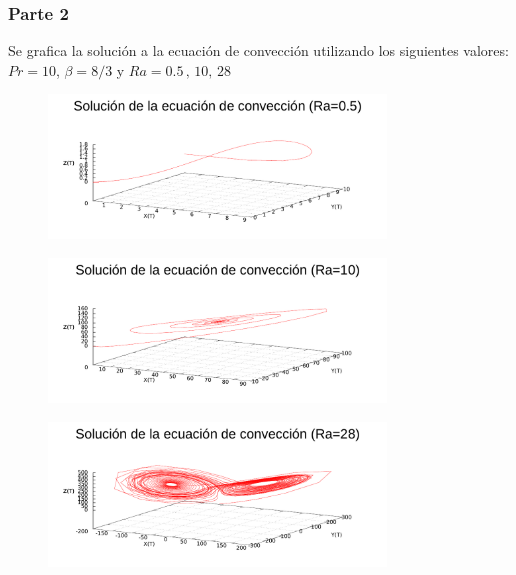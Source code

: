 
\subsubsection{Parte 2}

Se grafica la solución a la ecuación de convección utilizando los siguientes valores: $Pr=10$, $\beta= 8/3$ y $Ra = 0.5 \, , \, 10 , \, 28$ 

\begin{figure} [H]
\begin{center}
\includegraphics[width=0.8\textwidth]{./parte4/graficos/grafico_P3_3d_ra05.pdf}
\caption{}
\end{center}
\end{figure}

\begin{figure} [H]
\begin{center}
\includegraphics[width=0.8\textwidth]{./parte4/graficos/grafico_P3_3d_ra10.pdf}
\caption{}
\end{center}
\end{figure}

\begin{figure} [H]
\begin{center}
\includegraphics[width=0.8\textwidth]{./parte4/graficos/grafico_P3_3d_ra28.pdf}
\caption{}
\end{center}
\end{figure}

